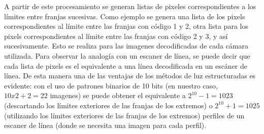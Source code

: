 A partir de este procesamiento se generan listas de pixeles correspondientes a los límites entre franjas sucesivas. Como ejemplo se genera una lista de los pixels correspondientes al límite entre las franjas con código 1 y 2, otra lista para los pixels correspondientes al límite entre las franjas con código 2 y 3, y así sucesivamente. Esto se realiza para las imagenes decodificadas de cada cámara utilizada.
Para observar la analogía con un escaner de línea, se puede decir que cada lista de pixels es el equivalente a una línea decodificada en un escáner de línea. De esta manera una de las ventajas de los métodos de luz estructuradas es evidente: con el uso de patrones binarios de 10 bits (en nuestro caso, $10 x 2 + 2 = 22$ imagenes) se puede obtener el equivalente a $2^{10} - 1 = 1023$ (descartando los límites exteriores de las franjas de los extremos) o $2^{10} + 1 = 1025$ (utilizando los límites exteriores de las franjas de los extremos) perfiles de un escaner de línea (donde se necesita una imagen para cada perfil).

